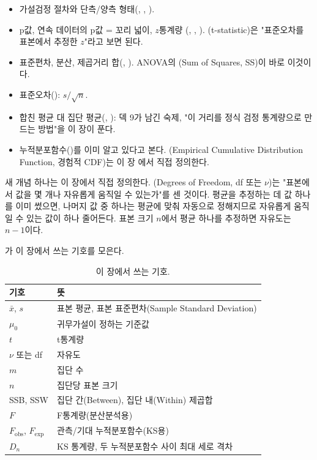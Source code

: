 \begin{itemize}
  \item 가설검정 절차와 단측/양측 형태(,
        , ).
  \item p값, 연속 데이터의 p값 = 꼬리 넓이, $z$통계량
        (, ,
        ). (t-statistic)은
        "표준오차를 표본에서 추정한 $z$"라고 보면 된다.
  \item 표준편차, 분산, 제곱거리 합(, ).
        ANOVA의 (Sum of Squares, SS)이 바로 이것이다.
  \item 표준오차(): $s/\sqrt n$.
  \item 합친 평균 대 집단 평균(,
        ): 덱 9가 남긴 숙제, "이 거리를 정식 검정
        통계량으로 만드는 방법"을 이 장이 푼다.
  \item 누적분포함수()를 이미 알고 있다고 본다.
        (Empirical Cumulative Distribution
        Function, 경험적 CDF)는 이 장 에서 직접 정의한다.
\end{itemize}

새 개념 하나는 이 장에서 직접 정의한다. (Degrees of
Freedom, df 또는 $\nu$)는 "표본에서 값을 몇 개나 자유롭게 움직일 수
있는가"를 센 것이다. 평균을 추정하는 데 값 하나를 이미 썼으면, 나머지
값 중 하나는 평균에 맞춰 자동으로 정해지므로 자유롭게 움직일 수 있는
값이 하나 줄어든다. 표본 크기 $n$에서 평균 하나를 추정하면 자유도는
$n-1$이다.

가 이 장에서 쓰는 기호를 모은다.

\begin{table}[H]\centering
\begin{tabularx}{\linewidth}{@{}l X@{}}
\toprule
기호 & 뜻 \\
\midrule
$\bar x$, $s$ & 표본 평균, 표본 표준편차(Sample Standard Deviation) \\
\midrule
$\mu_0$ & 귀무가설이 정하는 기준값 \\
\midrule
$t$ & t통계량 \\
\midrule
$\nu$ 또는 df & 자유도 \\
\midrule
$m$ & 집단 수 \\
\midrule
$n$ & 집단당 표본 크기 \\
\midrule
SSB, SSW & 집단 간(Between), 집단 내(Within) 제곱합 \\
\midrule
$F$ & F통계량(분산분석용) \\
\midrule
$F_{\text{obs}}$, $F_{\text{exp}}$ & 관측/기대 누적분포함수(KS용) \\
\midrule
$D_n$ & KS 통계량, 두 누적분포함수 사이 최대 세로 격차 \\
\bottomrule
\end{tabularx}
\caption{이 장에서 쓰는 기호.}
\label{tab:cd-symbols}
\end{table}

